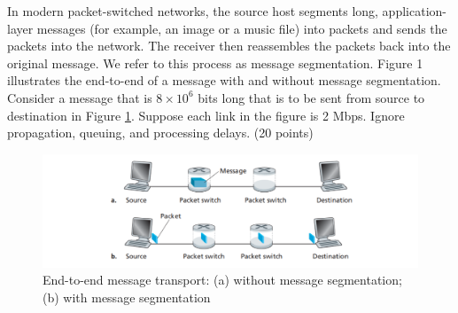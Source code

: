 \begin{exercise}[]{In modern packet-switched networks, the source host segments long, application- layer messages (for example, an image or a music file) into packets and sends the packets into the network. The receiver then reassembles the packets back into the original message. We refer to this process as message segmentation. Figure 1 illustrates the end-to-end of a message with and without message segmentation. Consider a message that is $8 \times 10^6$ bits long that is to be sent from source to destination in Figure \ref{fig1}. Suppose each link in the figure is 2 Mbps. Ignore propagation, queuing, and processing delays. (20 points)
    
    \begin{figure}[hb]
      \begin{center}
      \includegraphics[width=12cm]{img/ass1/fig1}
      \caption{End-to-end message transport: (a) without message segmentation; (b) with message segmentation}
      \label{fig1}
      \end{center}
    \end{figure}

}
\end{exercise}

